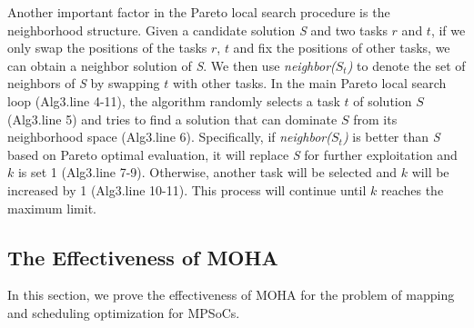 
Another important factor in the Pareto local search procedure is the neighborhood structure. Given a candidate solution \textit{S} and two tasks $r$ and $t$, if we only swap the positions of the tasks $r$, $t$ and fix the positions of other tasks, we can obtain a neighbor solution of \textit{S}. We then use \textit{neighbor($S_t$)} to denote the set of neighbors of \textit{S} by swapping $t$ with other tasks. In the main Pareto local search loop (Alg3.line 4-11), the algorithm randomly selects a task $t$ of solution $S$ (Alg3.line 5) and tries to find a solution that can dominate $S$ from its neighborhood space (Alg3.line 6). Specifically, if \textit{neighbor($S_t$)} is better than \textit{S} based on Pareto optimal evaluation, it will replace \textit{S} for further exploitation and $k$ is set 1 (Alg3.line 7-9). Otherwise, another task will be selected and $k$ will be increased by 1 (Alg3.line 10-11). This process will continue until $k$ reaches the maximum limit.



\subsection{The Effectiveness of MOHA}
In this section, we prove the effectiveness of MOHA for the problem of mapping and scheduling optimization for MPSoCs.

